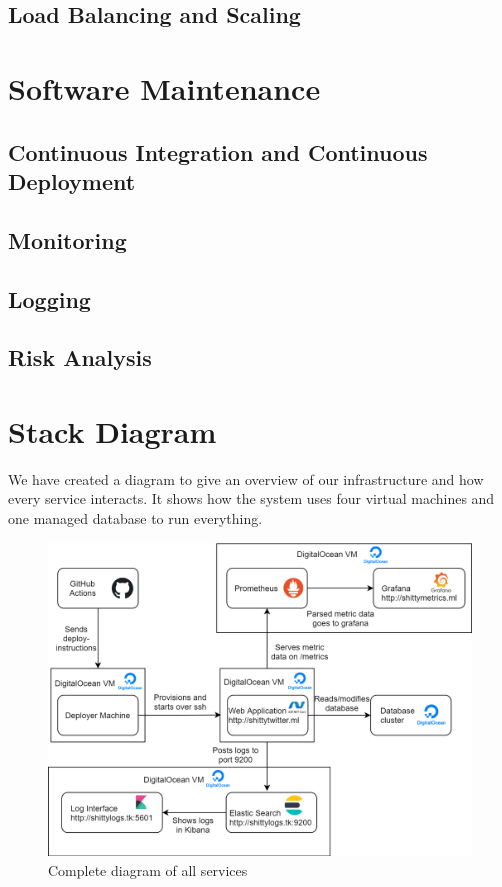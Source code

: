 \documentclass{article}
\begin{document}
\subsection{Load Balancing and Scaling} \label{dockerswarm}


\section{Software Maintenance}

\subsection{Continuous Integration and Continuous Deployment}


\subsection{Monitoring}


\subsection{Logging}


\subsection{Risk Analysis}


\section{Stack Diagram}
We have created a diagram to give an overview of our infrastructure and how every service interacts. It shows how the system uses four virtual machines and one managed database to run everything.
\begin{figure}[h]
    \centering
    \includegraphics[width=1\linewidth]{images/technologies.png}
    \caption{Complete diagram of all services}
    \label{fig:technology_diagram}
\end{figure}
\end{document}
